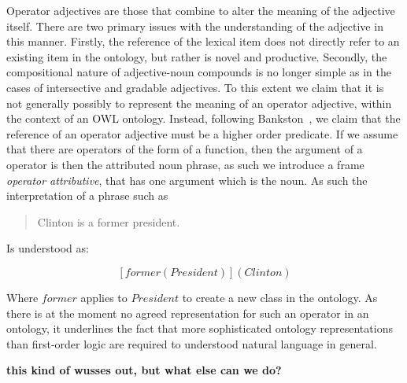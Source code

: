 \documentclass[11pt]{article}
\begin{document}
Operator adjectives are those that combine to alter the meaning of the adjective itself. 
There are two primary issues with the understanding of the adjective in this manner. 
Firstly, the reference of the lexical item does not directly refer to an existing item 
in the ontology, but rather is novel and productive. Secondly, the compositional nature 
of adjective-noun compounds is no longer simple as in the cases of intersective and gradable adjectives. 
To this extent we claim that it is not generally possibly to represent the 
meaning of an operator adjective, within the context of an OWL ontology.
Instead, following Bankston~\cite{bankston2003modeling}, we claim that
the reference of an operator adjective must be a higher order predicate.
If we assume that there are operators of the form of a function, then
the argument of a operator is then the attributed noun phrase, as such
we introduce a frame \emph{operator attributive}, that has one argument
which is the noun. As such the interpretation of a phrase such as

\begin{quote}
Clinton is a former president.
\end{quote}

Is understood as:

\[
[former(President)](Clinton)
\]

Where $former$ applies to $President$ to create a new class in the ontology.
As there is at the moment no agreed representation for such an operator in an
ontology, it underlines the fact that more sophisticated ontology representations than first-order logic are required to understood natural
language in general.

\textbf{this kind of wusses out, but what else can we do?}
\end{document}
